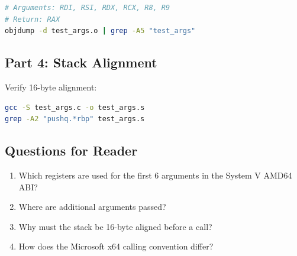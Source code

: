 \begin{lstlisting}[language=bash]
# Arguments: RDI, RSI, RDX, RCX, R8, R9
# Return: RAX
objdump -d test_args.o | grep -A5 "test_args"
\end{lstlisting}

\subsection{Part 4: Stack Alignment}

Verify 16-byte alignment:

\begin{lstlisting}[language=bash]
gcc -S test_args.c -o test_args.s
grep -A2 "pushq.*rbp" test_args.s
\end{lstlisting}

\subsection{Questions for Reader}

\begin{enumerate}
\item Which registers are used for the first 6 arguments in the System V AMD64 ABI?
\item Where are additional arguments passed?
\item Why must the stack be 16-byte aligned before a call?
\item How does the Microsoft x64 calling convention differ?
\end{enumerate}
